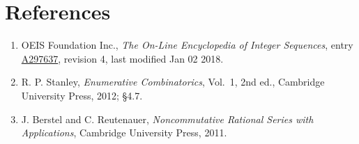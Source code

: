 \documentclass[11pt]{article}
\theoremstyle{definition}
\begin{document}
\section{References}

\begin{enumerate}

\item OEIS Foundation Inc., \emph{The On-Line Encyclopedia of Integer Sequences}, entry \href{https://oeis.org/A297637}{A297637}, revision 4, last modified Jan 02 2018.

\item R. P. Stanley, \emph{Enumerative Combinatorics}, Vol.~1, 2nd ed., Cambridge University Press, 2012; \S4.7.

\item J. Berstel and C. Reutenauer, \emph{Noncommutative Rational Series with Applications}, Cambridge University Press, 2011.

\end{enumerate}
\end{document}
